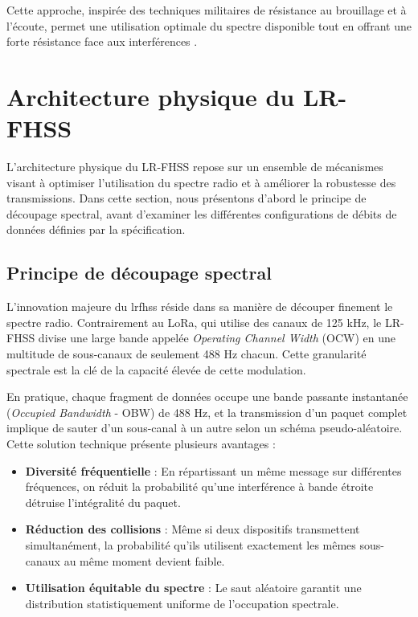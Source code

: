 Cette approche, inspirée des techniques militaires de résistance au brouillage et à l'écoute, permet une utilisation optimale du spectre disponible tout en offrant une forte résistance face aux interférences \cite{semtech2022lrfhss}.

\section{Architecture physique du LR-FHSS}

L’architecture physique du LR-FHSS repose sur un ensemble de mécanismes visant à optimiser l’utilisation du spectre radio et à améliorer la robustesse des transmissions. Dans cette section, nous présentons d’abord le principe de découpage spectral, avant d’examiner les différentes configurations de débits de données définies par la spécification.

\subsection{Principe de découpage spectral}

L'innovation majeure du \gls{lrfhss} réside dans sa manière de découper finement le spectre radio. Contrairement au LoRa, qui utilise des canaux de 125 kHz, le LR-FHSS divise une large bande appelée \textit{Operating Channel Width} (OCW) en une multitude de sous-canaux de seulement 488 Hz chacun. Cette granularité spectrale est la clé de la capacité élevée de cette modulation.

En pratique, chaque fragment de données occupe une bande passante instantanée (\textit{Occupied Bandwidth} - OBW) de 488 Hz, et la transmission d'un paquet complet implique de sauter d'un sous-canal à un autre selon un schéma pseudo-aléatoire. Cette solution technique présente plusieurs avantages :

\begin{itemize}
	\item \textbf{Diversité fréquentielle} : En répartissant un même message sur différentes fréquences, on réduit la probabilité qu'une interférence à bande étroite détruise l'intégralité du paquet.
	
	\item \textbf{Réduction des collisions} : Même si deux dispositifs transmettent simultanément, la probabilité qu'ils utilisent exactement les mêmes sous-canaux au même moment devient faible.
	
	\item \textbf{Utilisation équitable du spectre} : Le saut aléatoire garantit une distribution statistiquement uniforme de l'occupation spectrale.
\end{itemize}

